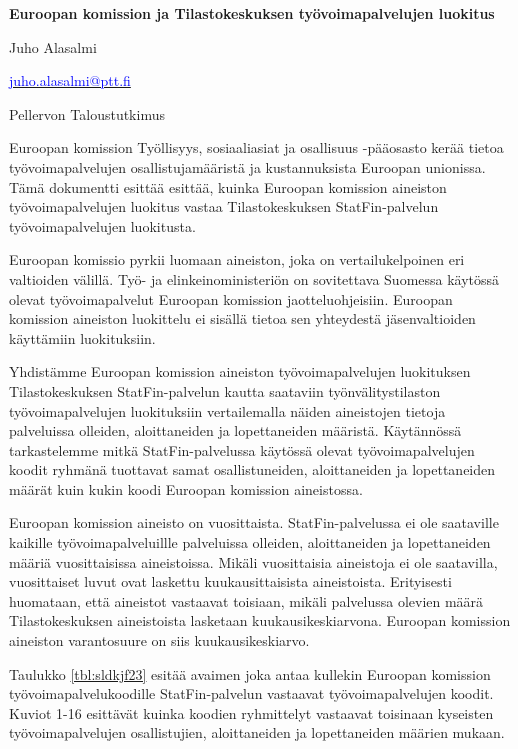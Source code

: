 \documentclass[12pt]{article}
\begin{document}
\noindent \textbf{Euroopan komission ja Tilastokeskuksen työvoimapalvelujen luokitus} \par
\vspace{0.5cm}

\noindent Juho Alasalmi{\par}
\noindent \href{mailto: juho.alasalmi@ptt.fi}{\textcolor{blue}{juho.alasalmi@ptt.fi}}{\par}
\noindent Pellervon Taloustutkimus {\par}

\vspace{0.5cm}

Euroopan komission Työllisyys, sosiaaliasiat ja osallisuus -pääosasto kerää tietoa työvoimapalvelujen osallistujamääristä ja kustannuksista Euroopan unionissa. Tämä dokumentti esittää esittää, kuinka Euroopan komission aineiston työvoimapalvelujen luokitus vastaa Tilastokeskuksen StatFin-palvelun työvoimapalvelujen luokitusta. 

Euroopan komissio pyrkii luomaan aineiston, joka on vertailukelpoinen eri valtioiden välillä. Työ- ja elinkeinoministeriön on sovitettava Suomessa käytössä olevat työvoimapalvelut Euroopan komission jaotteluohjeisiin. Euroopan komission aineiston luokittelu ei sisällä tietoa sen yhteydestä jäsenvaltioiden käyttämiin luokituksiin. 

Yhdistämme Euroopan komission aineiston työvoimapalvelujen luokituksen Tilastokeskuksen StatFin-palvelun kautta saataviin työnvälitystilaston työvoimapalvelujen luokituksiin vertailemalla näiden aineistojen tietoja palveluissa olleiden, aloittaneiden ja lopettaneiden määristä. Käytännössä tarkastelemme mitkä StatFin-palvelussa käytössä olevat työvoimapalvelujen koodit ryhmänä tuottavat samat osallistuneiden, aloittaneiden ja lopettaneiden määrät kuin kukin koodi Euroopan komission aineistossa.

Euroopan komission aineisto on vuosittaista. StatFin-palvelussa ei ole saataville kaikille työvoimapalveluillle palveluissa olleiden, aloittaneiden ja lopettaneiden määriä vuosittaisissa aineistoissa. Mikäli vuosittaisia aineistoja ei ole saatavilla, vuosittaiset luvut ovat laskettu kuukausittaisista aineistoista. Erityisesti huomataan, että aineistot vastaavat toisiaan, mikäli palvelussa olevien määrä Tilastokeskuksen aineistoista lasketaan kuukausikeskiarvona. Euroopan komission aineiston varantosuure on siis kuukausikeskiarvo.

Taulukko \ref{tbl:sldkjf23} esitää avaimen joka antaa kullekin Euroopan komission työvoimapalvelukoodille StatFin-palvelun vastaavat työvoimapalvelujen koodit. Kuviot 1-16 esittävät kuinka koodien ryhmittelyt vastaavat toisinaan kyseisten työvoimapalvelujen osallistujien, aloittaneiden ja lopettaneiden määrien mukaan.
\end{document}
